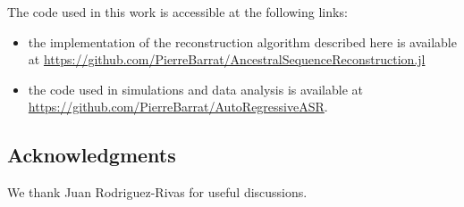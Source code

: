 The code used in this work is accessible at the following links:
\begin{itemize}
	\item the implementation of the reconstruction algorithm described here is available at \url{https://github.com/PierreBarrat/AncestralSequenceReconstruction.jl}
	\item the code used in simulations and data analysis is available at \url{https://github.com/PierreBarrat/AutoRegressiveASR}. 
\end{itemize}

\subsection*{Acknowledgments} We thank Juan Rodriguez-Rivas for useful discussions. 
